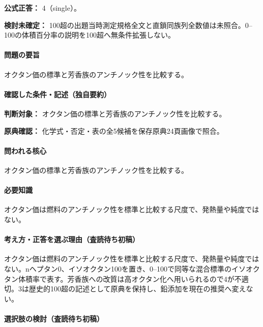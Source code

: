 \textbf{公式正答：} 4（single）。

\par\textbf{検討未確定：} 100超の出題当時測定規格全文と直鎖同族列全数値は未照合。0–100の体積百分率の説明を100超へ無条件拡張しない。

\paragraph{問題の要旨} オクタン価の標準と芳香族のアンチノック性を比較する。

\paragraph{確認した条件・記述（独自要約）}\mbox{}\par

\noindent\textbf{判断対象：} オクタン価の標準と芳香族のアンチノック性を比較する。\par

\noindent\textbf{原典確認：} 化学式・否定・表の全5候補を保存原典24頁画像で照合。\par

\paragraph{問われる核心} オクタン価の標準と芳香族のアンチノック性を比較する。

\paragraph{必要知識} オクタン価は燃料のアンチノック性を標準と比較する尺度で、発熱量や純度ではない。

\paragraph{考え方・正答を選ぶ理由（査読待ち初稿）} オクタン価は燃料のアンチノック性を標準と比較する尺度で、発熱量や純度ではない。nヘプタン0、イソオクタン100を置き、0–100で同等な混合標準のイソオクタン体積率で表す。芳香族への改質は高オクタン化へ用いられるので4が不適切。3は歴史的100超の記述として原典を保持し、鉛添加を現在の推奨へ変えない。

\paragraph{選択肢の検討（査読待ち初稿）}\mbox{}\par

